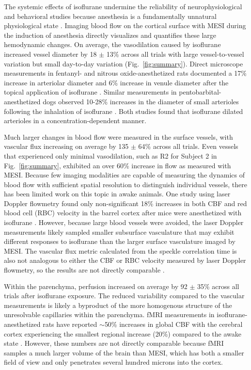 \documentclass[12pt]{spieman}
\begin{document}
\begin{spacing}{2}
The systemic effects of isoflurane undermine the reliability of neurophysiological and behavioral studies because anesthesia is a fundamentally unnatural physiological state \cite{Gao:2017tw}. Imaging blood flow on the cortical surface with MESI during the induction of anesthesia directly visualizes and quantifies these large hemodynamic changes. On average, the vasodilation caused by isoflurane increased vessel diameter by 18 $\pm$ 13\% across all trials with large vessel-to-vessel variation but small day-to-day variation (Fig.~\ref{fig:summary}). Direct microscope measurements in fentanyl- and nitrous oxide-anesthetized rats documented a 17\% increase in arteriolar diameter and 6\% increase in venule diameter after the topical application of isoflurane \cite{Koenig:1994rn}. Similar measurements in pentobarbital-anesthetized dogs observed 10-28\% increases in the diameter of small arterioles following the inhalation of isoflurane \cite{Iida:1998th}. Both studies found that isoflurane dilated arterioles in a concentration-dependent manner.

Much larger changes in blood flow were measured in the surface vessels, with vascular flux increasing on average by 135 $\pm$ 64\% across all trials. Even vessels that experienced only minimal vasodilation, such as R2 for Subject 2 in Fig.~\ref{fig:summary}, exhibited an over 60\% increase in flow as measured with MESI. Because few imaging modalities are capable of measuring the dynamics of blood flow with sufficient spatial resolution to distinguish individual vessels, there has been limited work on this topic in awake animals. One study using laser Doppler flowmetry found only non-significant 18\% increases in both CBF and red blood cell (RBC) velocity in the barrel cortex after mice were anesthetized with isoflurane \cite{Takuwa:2012ee}. However, because large blood vessels were avoided, the laser Doppler measurements likely sampled smaller subsurface vasculature that may exhibit different responses to isoflurane than the larger surface vasculature imaged by MESI. The vascular flux metric calculated from the speckle correlation time is also not analogous to either the CBF or RBC velocity measured by laser Doppler flowmetry, so the results are not directly comparable \cite{Kazmi:2015du}.

Within the parenchyma, perfusion increased on average by 92 $\pm$ 35\% across all trials after isoflurane exposure. The reduced variability compared to the vascular measurements is likely a byproduct of the more homogenous structure of the unresolvable capillaries within the parenchyma. fMRI measurements in isoflurane-anesthetized rats have reported $\sim$50\% increases in global CBF with the cerebral cortex experiencing the smallest regional increase (20\%) compared to the awake state \cite{Sicard:2003dj}. However, these numbers are not directly comparable because fMRI samples a much larger volume of the brain than MESI, which has both a smaller field of view and only penetrates several hundred microns into the cortex.


\end{spacing}
\end{document}
